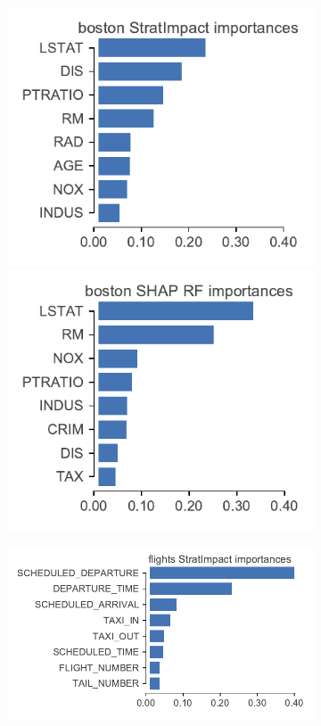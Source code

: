 \documentclass[12pt]{article}
\begin{document}
\begin{figure}
\centering
\begin{subfigure}{1\textwidth}
    \centering
\includegraphics[scale=0.6]{images/boston-features.pdf}
\includegraphics[scale=0.6]{images/boston-features-shap-rf.pdf}
\vspace{-2mm}\vspace{3mm}
\end{subfigure}%
\hfill
\begin{subfigure}{1\textwidth}
    \centering
\includegraphics[scale=0.6]{images/flights-features.pdf}

\end{subfigure}
\end{figure}
\end{document}
